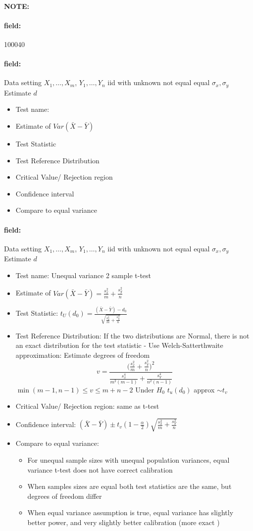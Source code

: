 \documentclass[12pt]{article}
\newenvironment{note}{\paragraph{NOTE:}}{}
\newenvironment{field}{\paragraph{field:}}{}
\begin{document}
\begin{note} \begin{field} \tiny 100040 \end{field}
 \begin{field}
  Data setting $X_1, \ldots , X_m$, $Y_1, \ldots, Y_n$ iid with unknown not equal equal  $\sigma_x, \sigma_y$ Estimate $d$
  \begin{itemize}
   \item Test name:
   \item Estimate of $Var(\bar{X} - \bar{Y})$
   \item Test Statistic
   \item Test Reference Distribution
   \item Critical Value/ Rejection region
   \item Confidence interval
   \item Compare to equal variance
  \end{itemize}
 \end{field}
 \begin{field}
  Data setting $X_1, \ldots , X_m$, $Y_1, \ldots, Y_n$ iid with unknown not equal equal  $\sigma_x, \sigma_y$ Estimate $d$
  \begin{itemize}
   \item Test name: Unequal variance 2 sample t-test
   \item Estimate of $Var(\bar{X} - \bar{Y}) = \frac{s_x^2}{m} + \frac{s_y^2}{n}$
   \item Test Statistic: $t_U(d_0) = \frac{(\bar{X} - \bar{Y}) - d_0}{\sqrt{\frac{s_x^2}{m} + \frac{s_y^2}{n}}}$
   \item Test Reference Distribution: If the two distributions are Normal, there is not an exact distribution for the test statistic -  Use Welch-Satterthwaite approximation: Estimate degrees of freedom
         $$ v = \frac{\big(\frac{s_x^2}{m} + \frac{s_y^2}{n}\big)^2}{\frac{s_x^4}{m^2(m-1)} + \frac{s_Y^4}{n^2(n-1)}}$$
         $\min(m-1,n-1) \leq v \leq m+n-2$
         Under $H_0$ $t_u(d_0) $ approx $\sim t_{v}$
   \item Critical Value/ Rejection region: same as t-test
   \item Confidence interval: $(\bar{X} - \bar{Y}) \pm t_v(1 - \frac{\alpha}{2})\sqrt{\frac{s_x^2}{m} + \frac{s_Y^2}{n}}$
   \item Compare to equal variance:
         \begin{itemize}
          \item For unequal sample sizes with unequal population variances, equal variance t-test does not have correct calibration
          \item When samples sizes are equal both test statistics are the same, but degrees of freedom differ
          \item When equal variance assumption is true, equal variance has slightly better power, and very slightly better calibration (more exact )
         \end{itemize}
  \end{itemize}
 \end{field}
\end{note}
\end{document}
